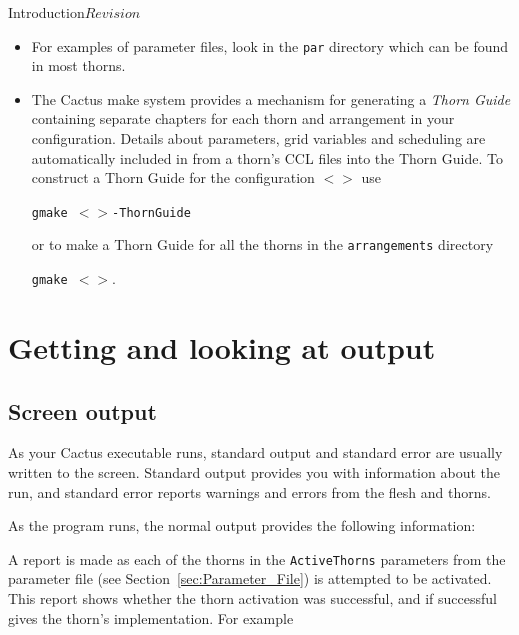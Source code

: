 \begin{cactuspart}{Introduction}{}{$Revision$}
\begin{itemize}
\item{} For examples of parameter files, look in the \texttt{par} directory
        which can be found in most thorns.

\item {}
The Cactus make system provides a mechanism for generating a
\textit{Thorn Guide} containing separate chapters for each thorn and
arrangement in your configuration. 
Details about parameters, grid variables and scheduling are
automatically included in from a thorn's CCL files into the Thorn
Guide. To construct a Thorn Guide for the configuration
\texttt{$<$$>$} use

\texttt{gmake $<$$>$-ThornGuide}

or to make a Thorn Guide for all the thorns in the \texttt{arrangements} directory

\texttt{gmake $<$$>$}.

\end{itemize}



\chapter{Getting and looking at output}


\section{Screen output}

As your Cactus executable runs, standard output and standard error
are usually written to the screen. Standard output provides you
with information about the run, and standard error reports warnings
and errors from the flesh and thorns.

As the program runs, the normal output provides the following information:

\begin{Lentry}

\item [Active thorns]
        A report is made as each of the thorns in the \texttt{ActiveThorns}
parameters from the parameter file (see Section~\ref{sec:Parameter_File})
is attempted to be activated. This report
shows whether the thorn activation was successful, and if successful gives the
thorn's implementation. For example


\end{Lentry}
\end{cactuspart}
